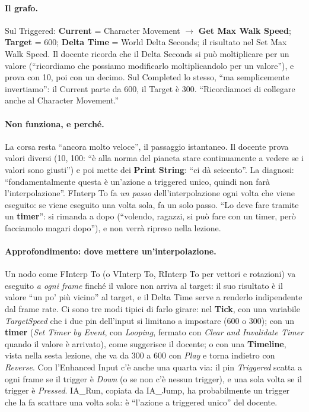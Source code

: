 \paragraph{Il grafo.} Sul Triggered: \textbf{Current} = Character Movement $\rightarrow$
\textbf{Get Max Walk Speed}; \textbf{Target} = 600; \textbf{Delta Time} = World Delta
Seconds; il risultato nel Set Max Walk Speed. Il docente ricorda che il Delta Seconds si
può moltiplicare per un valore (``ricordiamo che possiamo modificarlo moltiplicandolo
per un valore''), e prova con 10, poi con un decimo. Sul Completed lo stesso, ``ma
semplicemente invertiamo'': il Current parte da 600, il Target è 300. ``Ricordiamoci di
collegare anche al Character Movement.''

\paragraph{Non funziona, e perché.} La corsa resta ``ancora molto veloce'', il passaggio
istantaneo. Il docente prova valori diversi (10, 100: ``è alla norma del pianeta stare
continuamente a vedere se i valori sono giusti'') e poi mette dei \textbf{Print String}:
``ci dà seicento''. La diagnosi: ``fondamentalmente questa è un'azione a triggered
unico, quindi non farà l'interpolazione''. FInterp To fa \emph{un passo}
dell'interpolazione ogni volta che viene eseguito: se viene eseguito una volta sola, fa
un solo passo. ``Lo deve fare tramite un \textbf{timer}'': si rimanda a dopo (``volendo,
ragazzi, si può fare con un timer, però facciamolo magari dopo''), e non verrà ripreso
nella lezione.

\paragraph{Approfondimento: dove mettere un'interpolazione.} Un nodo come FInterp To
(o VInterp To, RInterp To per vettori e rotazioni) va eseguito \emph{a ogni frame}
finché il valore non arriva al target: il suo risultato è il valore ``un po' più vicino''
al target, e il Delta Time serve a renderlo indipendente dal frame rate. Ci sono tre
modi tipici di farlo girare: nel \textbf{Tick}, con una variabile \emph{TargetSpeed}
che i due pin dell'input si limitano a impostare (600 o 300); con un \textbf{timer}
(\emph{Set Timer by Event}, con \emph{Looping}, fermato con \emph{Clear and Invalidate
Timer} quando il valore è arrivato), come suggerisce il docente; o con una
\textbf{Timeline}, vista nella sesta lezione, che va da 300 a 600 con \emph{Play} e
torna indietro con \emph{Reverse}. Con l'Enhanced Input c'è anche una quarta via: il pin
\emph{Triggered} scatta a ogni frame se il trigger è \emph{Down} (o se non c'è nessun
trigger), e una sola volta se il trigger è \emph{Pressed}. IA\_Run, copiata da IA\_Jump,
ha probabilmente un trigger che la fa scattare una volta sola: è ``l'azione a triggered
unico'' del docente.

